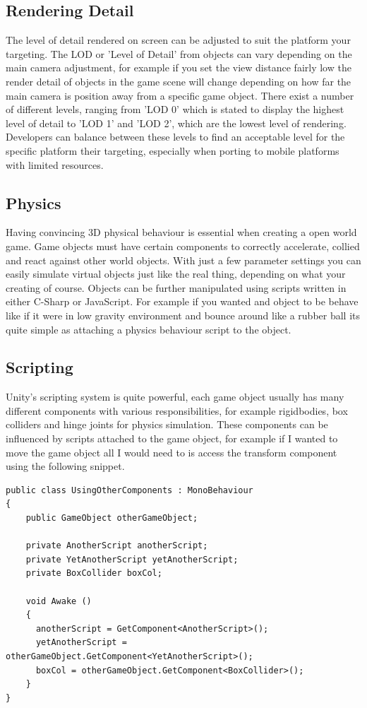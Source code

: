 \subsection{Rendering Detail}
The level of detail rendered on screen can be adjusted to suit the platform your targeting. The LOD or 'Level of Detail' from objects can vary depending on the main camera adjustment, for example if you set the view distance fairly low the render detail of objects in the game scene will change depending on how far the main camera is position away from a specific game object. There exist a number of different levels, ranging from 'LOD 0' which is stated to display the highest level of detail to 'LOD 1' and 'LOD 2', which are the lowest level of rendering. Developers can balance between these levels to find an acceptable level for the specific platform their targeting, especially when porting to mobile platforms with limited resources.

\subsection{Physics}
Having convincing 3D physical behaviour is essential when creating a open world game. Game objects must have certain components to correctly accelerate, collied and react against other world objects. With just a few parameter settings you can easily simulate virtual objects just like the real thing, depending on what your creating of course. Objects can be further manipulated using scripts written in either C-Sharp or JavaScript. For example if you wanted and object to be behave like if it were in low gravity environment and bounce around like a rubber ball its quite simple as attaching a physics behaviour script to the object. 

\subsection{Scripting}
Unity's scripting system is quite powerful, each game object usually has many different components with various responsibilities, for example rigidbodies, box colliders and hinge joints for physics simulation. These components can be influenced by scripts attached to the game object, for example if I wanted to move the game object all I would need to is access the transform component using the following snippet.

\begin{verbatim}
public class UsingOtherComponents : MonoBehaviour
{
	public GameObject otherGameObject;
	
	private AnotherScript anotherScript;
	private YetAnotherScript yetAnotherScript;
	private BoxCollider boxCol;
	
	void Awake ()
	{
	  anotherScript = GetComponent<AnotherScript>();
	  yetAnotherScript = otherGameObject.GetComponent<YetAnotherScript>();
	  boxCol = otherGameObject.GetComponent<BoxCollider>();
	}
}
\end{verbatim}

